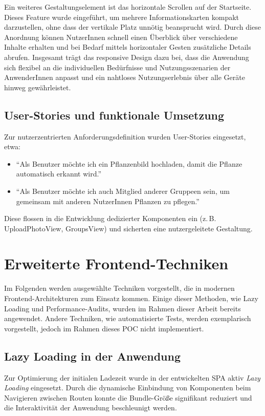 Ein weiteres Gestaltungselement ist das horizontale Scrollen auf der Startseite. Dieses Feature wurde eingeführt, um mehrere Informationskarten kompakt darzustellen, ohne dass der vertikale Platz unnötig beansprucht wird. Durch diese Anordnung können NutzerInnen schnell einen Überblick über verschiedene Inhalte erhalten und bei Bedarf mittels horizontaler Gesten zusätzliche Details abrufen. Insgesamt trägt das responsive Design dazu bei, dass die Anwendung sich flexibel an die individuellen Bedürfnisse und Nutzungsszenarien der AnwenderInnen anpasst und ein nahtloses Nutzungserlebnis über alle Geräte hinweg gewährleistet.

\subsection{User-Stories und funktionale Umsetzung}

Zur nutzerzentrierten Anforderungsdefinition wurden User-Stories eingesetzt, etwa:
\begin{itemize}
	\item \enquote{Als Benutzer möchte ich ein Pflanzenbild hochladen, damit die Pflanze automatisch erkannt wird.}
	\item \enquote{Als Benutzer möchte ich auch Mitglied anderer Gruppeen sein, um gemeinsam mit anderen NutzerInnen Pflanzen zu pflegen.}
\end{itemize}
Diese flossen in die Entwicklung dedizierter Komponenten ein (z.\,B. UploadPhotoView, GroupsView) und sicherten eine nutzergeleitete Gestaltung.

\section{Erweiterte Frontend-Techniken}
\label{sec:frontend-erweitert}

Im Folgenden werden ausgewählte Techniken vorgestellt, die in modernen Front\-end-Ar\-chi\-tek\-tur\-en zum Einsatz kommen. Einige dieser Methoden, wie Lazy Loading und Performance-Audits, wurden im Rahmen dieser Arbeit bereits angewendet. Andere Techniken, wie automatisierte Tests, werden exemplarisch vorgestellt, jedoch im Rahmen dieses \ac{POC} nicht implementiert.

\subsection{Lazy Loading in der Anwendung}

Zur Optimierung der initialen Ladezeit wurde in der entwickelten \ac{SPA} aktiv \emph{Lazy Loading} eingesetzt. Durch die dynamische Einbindung von Komponenten beim Navigieren zwischen Routen konnte die Bundle-Größe signifikant reduziert und die Interaktivität der Anwendung beschleunigt werden. 

